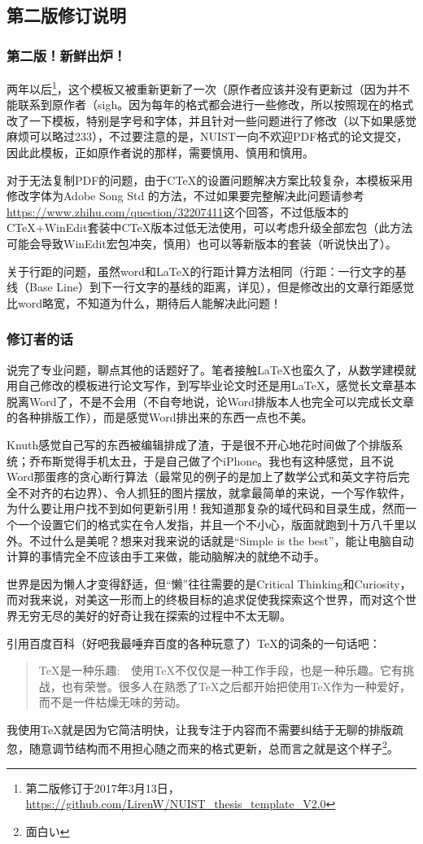 \subsection{第二版修订说明}

\subsubsection{第二版！新鲜出炉！}

两年以后\footnote{第二版修订于2017年3月13日，\url{https://github.com/LirenW/NUIST_thesis_template_V2.0}}，这个模板又被重新更新了一次（原作者应该并没有更新过（因为并不能联系到原作者（sigh。因为每年的格式都会进行一些修改，所以按照现在的格式改了一下模板，特别是字号和字体，并且针对一些问题进行了修改（以下如果感觉麻烦可以略过233），不过要注意的是，NUIST一向不欢迎PDF格式的论文提交，因此此模板，正如原作者说的那样，需要慎用、慎用和慎用。\par
对于无法复制PDF的问题，由于CTeX的设置问题解决方案比较复杂，本模板采用修改字体为Adobe Song Std 的方法，不过如果要完整解决此问题请参考\url{https://www.zhihu.com/question/32207411}这个回答，不过低版本的CTeX+WinEdit套装中CTeX版本过低无法使用，可以考虑升级全部宏包（此方法可能会导致WinEdit宏包冲突，慎用）也可以等新版本的套装（听说快出了）。\par
关于行距的问题，虽然word和LaTeX的行距计算方法相同（行距：一行文字的基线（Base Line）到下一行文字的基线的距离，详见\cite{x4}），但是修改出的文章行距感觉比word略宽，不知道为什么，期待后人能解决此问题！\par

\subsubsection{修订者的话}

说完了专业问题，聊点其他的话题好了。笔者接触LaTeX也蛮久了，从数学建模就用自己修改的模板进行论文写作，到写毕业论文时还是用LaTeX，感觉长文章基本脱离Word了，不是不会用（不自夸地说，论Word排版本人也完全可以完成长文章的各种排版工作），而是感觉Word排出来的东西一点也不美。\par
Knuth感觉自己写的东西被编辑排成了渣，于是很不开心地花时间做了个排版系统；乔布斯觉得手机太丑，于是自己做了个iPhone。我也有这种感觉，且不说Word那蛋疼的贪心断行算法（最常见的例子的是加上了数学公式和英文字符后完全不对齐的右边界）、令人抓狂的图片摆放，就拿最简单的来说，一个写作软件，为什么要让用户找不到如何更新引用！我知道那复杂的域代码和目录生成，然而一个一个设置它们的格式实在令人发指，并且一个不小心，版面就跑到十万八千里以外。不过什么是美呢？想来对我来说的话就是“Simple is the best”，能让电脑自动计算的事情完全不应该由手工来做，能动脑解决的就绝不动手。\par
世界是因为懒人才变得舒适，但“懒”往往需要的是Critical Thinking和Curiosity，而对我来说，对美这一形而上的终极目标的追求促使我探索这个世界，而对这个世界无穷无尽的美好的好奇让我在探索的过程中不太无聊。\par
引用百度百科（好吧我最唾弃百度的各种玩意了）TeX的词条的一句话吧：

\begin{quote}
  TeX是一种乐趣:　使用TeX不仅仅是一种工作手段，也是一种乐趣。它有挑战，也有荣誉。很多人在熟悉了TeX之后都开始把使用TeX作为一种爱好，而不是一件枯燥无味的劳动。
\end{quote}

我使用TeX就是因为它简洁明快，让我专注于内容而不需要纠结于无聊的排版疏忽，随意调节结构而不用担心随之而来的格式更新，总而言之就是这个样子\footnote{面白い}。\par